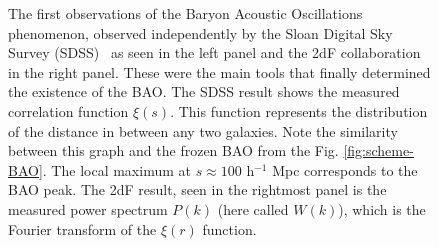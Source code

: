 \begin{figure}[t] \centering
	\hspace{0.2pt}
	\caption[First BAO observations by the SDSS and the 2dF collaborations.]{The first observations of the Baryon Acoustic Oscillations phenomenon, observed independently by the Sloan Digital Sky Survey (SDSS)~\cite{Eisenstein2005} as seen in the left panel and the 2dF collaboration~\cite{2dFCole2005} in the right panel. These were the main tools that finally determined the existence of the BAO. The SDSS result shows the measured correlation function $\xi(s)$. This function represents the distribution of the distance in between any two galaxies. Note the similarity between this graph and the frozen BAO from the Fig. \ref{fig:scheme-BAO}. The local maximum at $s\approx 100$ h$^{-1}$ Mpc corresponds to the BAO peak. The 2dF result, seen in the rightmost panel is the measured power spectrum $P(k)$ (here called  $W(k)$), which is the Fourier transform of the $\xi(r)$ function.}
	\label{fig:2005-results}
\end{figure}


